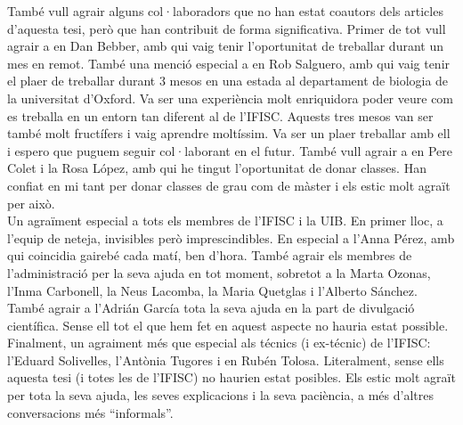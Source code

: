 {%
També vull agrair alguns col·laboradors que no han estat coautors dels articles
d'aquesta tesi, però que han contribuit de forma significativa. Primer de tot
vull agrair a en Dan Bebber, amb qui vaig tenir l'oportunitat de treballar
durant un mes en remot. També una menció especial a en Rob Salguero, amb qui
vaig tenir el plaer de treballar durant 3 mesos en una estada al departament de
biologia de la universitat d'Oxford. Va ser una experiència molt enriquidora
poder veure com es treballa en un entorn tan diferent al de l'IFISC. Aquests
tres mesos van ser també molt fructífers i vaig aprendre moltíssim. Va ser un
plaer treballar amb ell i espero que puguem seguir col·laborant en el futur.
També vull agrair a en Pere Colet i la Rosa López, amb qui he tingut
l'oportunitat de donar classes. Han confiat en mi tant per donar classes de
grau com de màster i els estic molt agraït per això. \\

Un agraïment especial a tots els membres de l'IFISC i la UIB. En primer lloc,
a l'equip de neteja, invisibles però imprescindibles. En especial a l'Anna
Pérez, amb qui coincidia gairebé cada matí, ben d'hora. També agrair els
membres de l'administració per la seva ajuda en tot moment, sobretot a la Marta
Ozonas, l'Inma Carbonell, la Neus Lacomba, la Maria Quetglas i l'Alberto
Sánchez. També agrair a l'Adrián García tota la seva ajuda en la part de
divulgació científica. Sense ell tot el que hem fet en aquest aspecte no hauria
estat possible. Finalment, un agraiment més que especial als técnics (i
ex-técnic) de l'IFISC: l'Eduard Solivelles, l'Antònia Tugores i en Rubén
Tolosa. Literalment, sense ells aquesta tesi (i totes les de l'IFISC) no
haurien estat posibles. Els estic molt agraït per tota la seva ajuda, les seves
explicacions i la seva paciència, a més d'altres conversacions més
``informals''. \\

}

